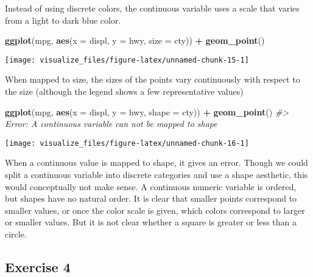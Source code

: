 \documentclass[]{book}
\newenvironment{Shaded}{\begin{snugshade}}{\end{snugshade}}
\newcommand{\CommentTok}[1]{\textcolor[rgb]{0.56,0.35,0.01}{\textit{#1}}}
\newcommand{\DataTypeTok}[1]{\textcolor[rgb]{0.13,0.29,0.53}{#1}}
\newcommand{\KeywordTok}[1]{\textcolor[rgb]{0.13,0.29,0.53}{\textbf{#1}}}
\newcommand{\NormalTok}[1]{#1}
\newcommand{\OperatorTok}[1]{\textcolor[rgb]{0.81,0.36,0.00}{\textbf{#1}}}
\newcommand{\StringTok}[1]{\textcolor[rgb]{0.31,0.60,0.02}{#1}}
\theoremstyle{plain}
\theoremstyle{remark}
\theoremstyle{definition}
\theoremstyle{definition}
\theoremstyle{definition}
\theoremstyle{remark}
\begin{document}
Instead of using discrete colors, the continuous variable uses a scale
that varies from a light to dark blue color.

\begin{Shaded}
\begin{Highlighting}[]
\KeywordTok{ggplot}\NormalTok{(mpg, }\KeywordTok{aes}\NormalTok{(}\DataTypeTok{x =}\NormalTok{ displ, }\DataTypeTok{y =}\NormalTok{ hwy, }\DataTypeTok{size =}\NormalTok{ cty)) }\OperatorTok{+}
\StringTok{  }\KeywordTok{geom_point}\NormalTok{()}
\end{Highlighting}
\end{Shaded}

\begin{center}\texttt{[image: visualize\_files/figure-latex/unnamed-chunk-15-1]} \end{center}

When mapped to size, the sizes of the points vary continuously with
respect to the size (although the legend shows a few representative
values)

\begin{Shaded}
\begin{Highlighting}[]
\KeywordTok{ggplot}\NormalTok{(mpg, }\KeywordTok{aes}\NormalTok{(}\DataTypeTok{x =}\NormalTok{ displ, }\DataTypeTok{y =}\NormalTok{ hwy, }\DataTypeTok{shape =}\NormalTok{ cty)) }\OperatorTok{+}
\StringTok{  }\KeywordTok{geom_point}\NormalTok{()}
\CommentTok{#> Error: A continuous variable can not be mapped to shape}
\end{Highlighting}
\end{Shaded}

\begin{center}\texttt{[image: visualize\_files/figure-latex/unnamed-chunk-16-1]} \end{center}

When a continuous value is mapped to shape, it gives an error. Though we
could split a continuous variable into discrete categories and use a
shape aesthetic, this would conceptually not make sense. A continuous
numeric variable is ordered, but shapes have no natural order. It is
clear that smaller points correspond to smaller values, or once the
color scale is given, which colors correspond to larger or smaller
values. But it is not clear whether a square is greater or less than a
circle.

\hypertarget{exercise-4}{%
\subsection{Exercise 4}\label{exercise-4}}
\end{document}
